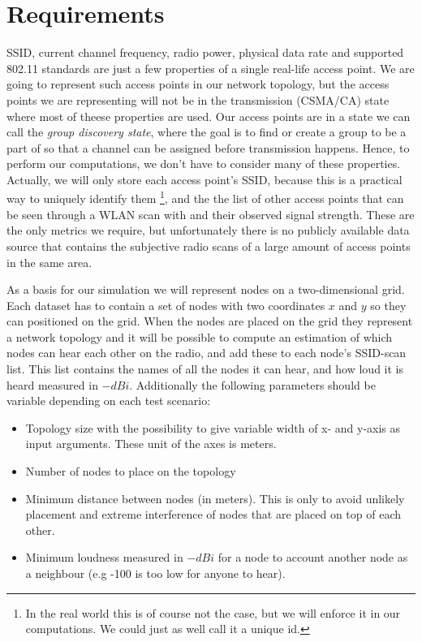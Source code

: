 \section{Requirements}
SSID, current channel frequency, radio power, physical data rate and supported 802.11 standards are just a few properties of a single real-life access point.
We are going to represent such access points in our network topology, but the access points we are representing will not be in the transmission (CSMA/CA) state where
most of theese properties are used. Our access points are in a state we can call the \textit{group discovery state}, where the goal is to find or create a group to be a part of
so that a channel can be assigned before transmission happens. Hence, to perform our computations, we don't have to consider many of these properties.
Actually, we will only store each access point's SSID, because this is a practical way to uniquely identify them \footnote{In the real world this is of course not the case,
but we will enforce it in our computations. We could just as well call it a unique id.},  and the the list of other access points that can be seen through a WLAN scan with
and their observed signal strength. These are the only metrics we require, but unfortunately there is no publicly available data source that contains the subjective radio scans
of a large amount of access points in the same area.

As a basis for our simulation we will represent nodes on a two-dimensional grid. Each dataset has to contain a set of nodes with two coordinates $x$ and $y$ so they can
positioned on the grid. When the nodes are placed on the grid they represent a network topology
and it will be possible to compute an estimation of which nodes can hear each other on the radio, and add these to each node's SSID-scan list.
This list contains the names of all the nodes it can hear, and how loud it is heard measured in $-dBi$.
Additionally the following parameters should be variable depending on each test scenario:

\begin{itemize}
	\item Topology size with the possibility to give variable width of x- and y-axis as input arguments. These unit of the axes is meters.
	\item Number of nodes to place on the topology
	\item Minimum distance between nodes (in meters). This is only to avoid unlikely placement and extreme interference of nodes that are placed on top of each other. 
	\item Minimum loudness measured in $-dBi$ for a node to account another node as a neighbour (e.g -100 is too low for anyone to hear).
\end{itemize}



